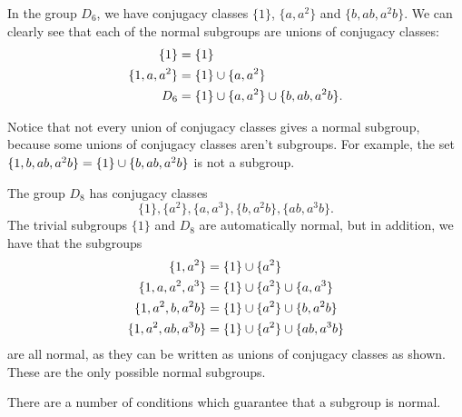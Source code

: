 \begin{example}
  In the group $D_{6}$, we have conjugacy classes $\{1\}$, $\{a, a^{2}\}$
  and $\{b, ab, a^{2}b\}$.  We can clearly see that each of the normal
  subgroups are unions of conjugacy classes:
  \begin{align*}
    \{1\} &= \{1\} \\
    \{1, a, a^{2}\} &= \{1\} \cup \{a, a^{2}\} \\
    D_{6} &= \{1\} \cup \{a, a^{2}\} \cup \{b, ab, a^{2}b\}.
  \end{align*}
  
  Notice that not every union of conjugacy classes gives a normal subgroup,
  because some unions of conjugacy classes aren't subgroups.  For example,
  the set $\{1, b, ab, a^{2}b\} = \{1\} \cup \{b, ab, a^{2}b\}$ is not a
  subgroup.
\end{example}

\begin{example}
  The group $D_{8}$ has conjugacy classes
  \[
    \{1\}, \{a^{2}\}, \{a, a^{3}\}, \{b, a^{2}b\}, \{ab, a^{3}b\}.
  \]
  The trivial subgroups $\{1\}$ and $D_{8}$ are automatically normal, but in
  addition, we have that the subgroups
  \begin{align*}
    \{1, a^{2}\} &= \{1\} \cup \{a^{2}\} \\
    \{1, a, a^{2}, a^{3}\} &= \{1\} \cup \{a^{2}\} \cup \{a, a^{3}\} \\
    \{1, a^{2}, b, a^{2}b \} &= \{1\} \cup \{a^{2}\} \cup \{b, a^{2}b\} \\
    \{1, a^{2}, ab, a^{3}b \} &= \{1\} \cup \{a^{2}\} \cup \{ab, a^{3}b\}
  \end{align*}
  are all normal, as they can be written as unions of conjugacy classes as
  shown.  These are the only possible normal subgroups.
\end{example}

There are a number of conditions which guarantee that a subgroup is normal.

